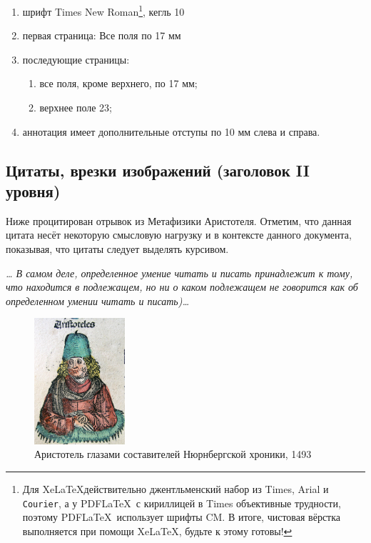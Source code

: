 \documentclass{spisok-article}
\begin{document}
\begin{enumerate}
\item
  шрифт Times New Roman\footnote{Для \ifxetex \XeLaTeX \else Xe\LaTeX \fi действительно
  джентльменский набор из Times, \textsf{Arial} и \texttt{Courier},
  а у PDF\LaTeX ~с кириллицей в Times объективные трудности, поэтому
  PDF\LaTeX ~использует шрифты CM.  В итоге, чистовая вёрстка
  выполняется при помощи \ifxetex \XeLaTeX \else Xe\LaTeX \fi, будьте к этому готовы!}, кегль 10
\item
  первая страница: Все поля по 17 мм
\item
  последующие страницы:

  \begin{enumerate}
  \item
    все поля, кроме верхнего, по 17 мм;
  \item
    верхнее поле 23;
  \end{enumerate}
\item
  аннотация имеет дополнительные отступы по 10 мм слева и справа.
\end{enumerate}

\subsection{Цитаты, врезки изображений (заголовок II уровня)}

Ниже процитирован отрывок из Метафизики Аристотеля. Отметим, что
данная цитата несёт некоторую смысловую нагрузку и в контексте данного
документа, показывая, что цитаты следует выделять курсивом.

\emph{\ldots{} В самом деле, определенное умение читать и писать
  принадлежит к тому, что находится в подлежащем, но ни о каком
  подлежащем не говорится как об определенном умении читать и
  писать)\ldots}

\begin{figure}[h]
\begin{center}
\includegraphics[width=0.3\textwidth]{Aristotle.jpg}
\end{center}
\caption{Аристотель глазами составителей Нюрнбергской хроники,
  1493}\label{fig:aristotle}
\end{figure}
\end{document}

